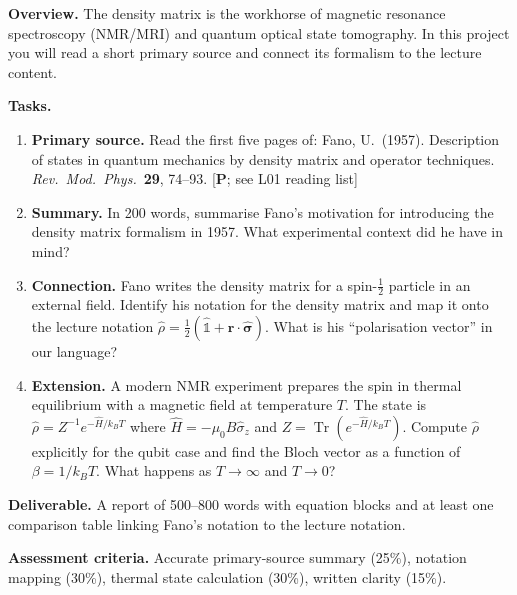 \documentclass[11pt,a4paper]{article}
\begin{document}
\begin{tcolorbox}[ugprobbox, title={Project J3 --- Density Matrices in NMR and Quantum Optics}]

\textbf{Overview.}
The density matrix is the workhorse of magnetic resonance spectroscopy (NMR/MRI)
and quantum optical state tomography. In this project you will read a short
primary source and connect its formalism to the lecture content.

\medskip\textbf{Tasks.}
\begin{enumerate}[leftmargin=1.8em, label=\textbf{\arabic*.}, itemsep=6pt]
  \item \textbf{Primary source.}
        Read the first five pages of:
        Fano, U.\ (1957). Description of states in quantum mechanics by density
        matrix and operator techniques.
        \textit{Rev.\ Mod.\ Phys.}\ \textbf{29}, 74--93. [\textbf{P}; see L01 reading list]
  \item \textbf{Summary.}
        In 200 words, summarise Fano's motivation for introducing the density
        matrix formalism in 1957. What experimental context did he have in mind?
  \item \textbf{Connection.}
        Fano writes the density matrix for a spin-$\tfrac{1}{2}$ particle in
        an external field. Identify his notation for the density matrix and map
        it onto the lecture notation $\hat{\rho}=\tfrac{1}{2}(\hat{\mathbb{1}}+\mathbf{r}\cdot\hat{\boldsymbol{\sigma}})$.
        What is his ``polarisation vector'' in our language?
  \item \textbf{Extension.}
        A modern NMR experiment prepares the spin in thermal equilibrium with a
        magnetic field at temperature $T$. The state is
        $\hat{\rho}=Z^{-1}e^{-\hat{H}/k_BT}$ where $\hat{H}=-\mu_0 B\hat{\sigma}_z$
        and $Z=\operatorname{Tr}(e^{-\hat{H}/k_BT})$.
        Compute $\hat{\rho}$ explicitly for the qubit case and find the Bloch vector
        as a function of $\beta=1/k_BT$.
        What happens as $T\to\infty$ and $T\to 0$?
\end{enumerate}

\medskip\textbf{Deliverable.}
A report of 500--800 words with equation blocks and at least one comparison
table linking Fano's notation to the lecture notation.

\medskip\textbf{Assessment criteria.}
Accurate primary-source summary (25\%), notation mapping (30\%),
thermal state calculation (30\%), written clarity (15\%).
\end{tcolorbox}
\end{document}
